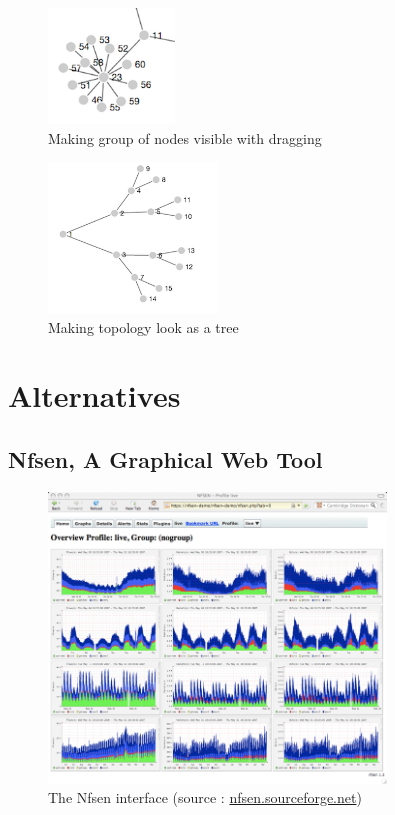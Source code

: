 \begin{figure}[!h]
	\centering
	\includegraphics[width=0.3\textwidth]{res/visible.png}
	\caption{Making group of nodes visible with dragging}
	\label{fig:visible}
\end{figure}

\begin{figure}[!h]
	\centering
	\includegraphics[width=0.4\textwidth]{res/dragtree.png}
	\caption{Making topology look as a tree}
	\label{fig:tree}
\end{figure}


\chapter{Alternatives}

\section{Nfsen, A Graphical Web Tool}
\begin{figure}[!h]
	\centering
	\includegraphics[width=0.8\textwidth]{res/nfsen.png}
	\caption{The Nfsen interface (source : \url{nfsen.sourceforge.net})}
	\label{fig:nfsen}
\end{figure}

